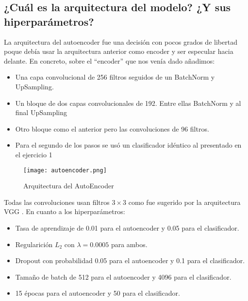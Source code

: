 \documentclass{article}
\begin{document}
\subsection{¿Cuál es la arquitectura del modelo? ¿Y sus hiperparámetros?}

La arquitectura del autoencoder fue una decisión con pocos grados de libertad poque debía usar la arquitectura anterior como encoder y ser especular hacia delante. En concreto, sobre el ``encoder'' 
que nos venía dado añadimos:
\begin{itemize}
    \item Una capa convolucional de 256 filtros seguidos de un BatchNorm \cite{ioffe2015batch} y UpSampling.
    \item Un bloque de dos capas convolucionales de 192. Entre ellas BatchNorm y al final UpSampling
    \item Otro bloque como el anterior pero las convoluciones de 96 filtros.
    \item Para el segundo de los pasos se usó un clasificador idéntico al presentado en el ejercicio 1
\end{itemize}

\begin{figure}[h]
    \centering
    \texttt{[image: autoencoder.png]}
    \caption{Arquitectura del AutoEncoder}
    \label{fig:enter-label}
\end{figure}

Todas las convoluciones usan filtros $3 \times 3$ como fue sugerido por la arquitectura VGG \cite{simonyan2014very}. En cuanto a los hiperparámetros:

\begin{itemize}
    \item Tasa de aprendizaje de 0.01 para el autoencoder y 0.05 para el clasificador.
    \item Regularición $L_{2}$ con $\lambda = 0.0005$ para ambos.
    \item Dropout con probabilidad 0.05 para el autoencoder y 0.1 para el clasificador.
    \item Tamaño de batch de 512 para el autoencoder y 4096 para el clasificador.
    \item 15 épocas para el autoencoder y 50 para el clasificador.
\end{itemize}
\end{document}

